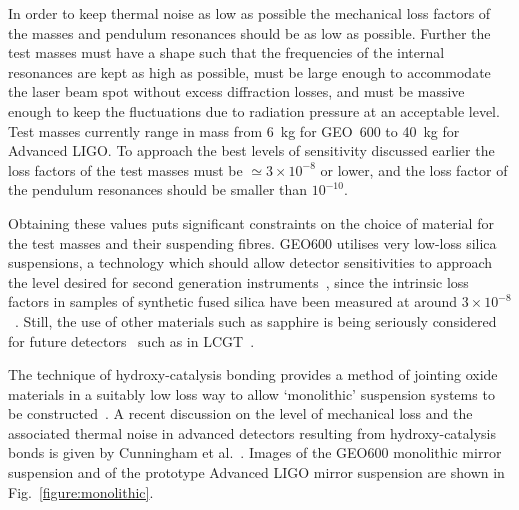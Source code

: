 \documentclass{article}
\begin{document}
In order to keep thermal noise as low as possible the mechanical loss factors of
the masses and pendulum resonances should be as low as possible. Further the
test masses must have a shape such that the frequencies of the internal
resonances are kept as high as possible, must be large enough to accommodate the
laser beam spot without excess diffraction losses, and must be massive enough to
keep the fluctuations due to radiation pressure at an acceptable level. Test
masses currently range in mass from 6~kg for GEO~600 to 40~kg for Advanced LIGO.
To approach the best levels of sensitivity discussed earlier the loss factors of
the test masses must be $\simeq 3 \times 10^{-8}$ or lower, and the loss factor
of the pendulum resonances should be smaller than $10^{-10}$.

Obtaining these values puts significant constraints on the choice of material
for the test masses and their suspending fibres. GEO600 utilises very low-loss
silica suspensions, a technology which should allow detector sensitivities to
approach the level desired for second generation instruments~\cite{Braginsky1,
Rowan1, Rowan2}, since the intrinsic loss factors in samples of synthetic fused
silica have been measured at around $3 \times 10^{-8}$~\cite{Lunin, Startin}.
Still, the use of other materials such as sapphire is being seriously considered
for future detectors~\cite{Braginsky2, Ju2, Rowan1} such as in
LCGT~\cite{Miyoki:2005, Ohashi:2008}.

The technique of hydroxy-catalysis bonding provides a method of jointing oxide
materials in a suitably low loss way to allow `monolithic' suspension systems to
be constructed~\cite{Rowan3}. A recent discussion on the level of mechanical
loss and the associated thermal noise in advanced detectors resulting from
hydroxy-catalysis bonds is given by Cunningham et al.~\cite{Cunningham:2010}.
Images of the GEO600 monolithic mirror suspension and of the prototype Advanced
LIGO mirror suspension are shown in Fig.~\ref{figure:monolithic}.

\end{document}
